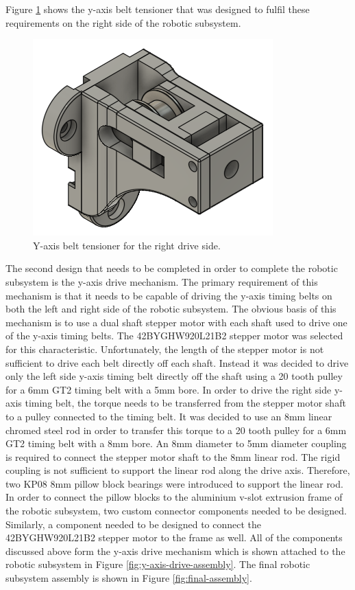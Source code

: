 Figure \ref{fig:y-axis-belt-tensioner-right} shows the y-axis belt tensioner that was designed to fulfil these requirements on the right side of the robotic subsystem.

\begin{figure}[H]
	\centering
	\includegraphics[width=0.4\linewidth]{figures/y-axis-belt-tensioner-right.png}
	\caption{Y-axis belt tensioner for the right drive side.}
	\label{fig:y-axis-belt-tensioner-right}
\end{figure}

The second design that needs to be completed in order to complete the robotic subsystem is the y-axis drive mechanism. The primary requirement of this mechanism is that it needs to be capable of driving the y-axis timing belts on both the left and right side of the robotic subsystem. The obvious basis of this mechanism is to use a dual shaft stepper motor with each shaft used to drive one of the y-axis timing belts. The 42BYGHW920L21B2 stepper motor was selected for this characteristic. Unfortunately, the length of the stepper motor is not sufficient to drive each belt directly off each shaft. Instead it was decided to drive only the left side y-axis timing belt directly off the shaft using a 20 tooth pulley for a 6mm GT2 timing belt with a 5mm bore. In order to drive the right side y-axis timing belt, the torque needs to be transferred from the stepper motor shaft to a pulley connected to the timing belt. It was decided to use an 8mm linear chromed steel rod in order to transfer this torque to a 20 tooth pulley for a 6mm GT2 timing belt with a 8mm bore. An 8mm diameter to 5mm diameter coupling is required to connect the stepper motor shaft to the 8mm linear rod. The rigid coupling is not sufficient to support the linear rod along the drive axis. Therefore, two KP08 8mm pillow block bearings were introduced to support the linear rod. In order to connect the pillow blocks to the aluminium v-slot extrusion frame of the robotic subsystem, two custom connector components needed to be designed. Similarly, a component needed to be designed to connect the 42BYGHW920L21B2 stepper motor to the frame as well. All of the components discussed above form the y-axis drive mechanism which is shown attached to the robotic subsystem in Figure \ref{fig:y-axis-drive-assembly}. The final robotic subsystem assembly is shown in Figure \ref{fig:final-assembly}.

